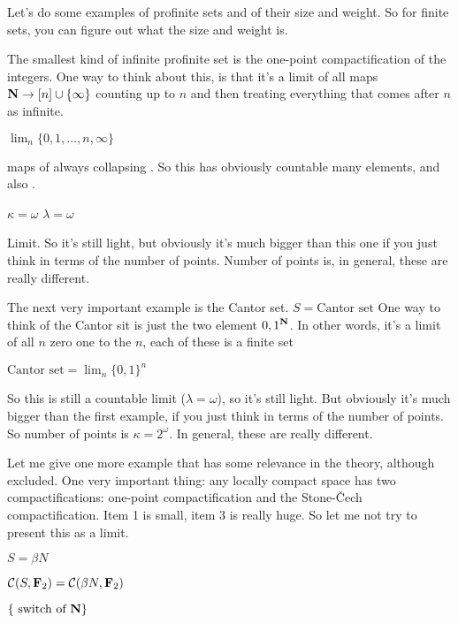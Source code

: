 \begin{example}
Let's do some examples of profinite sets and of their size and weight. 
So for finite sets, you can figure out what the size and weight is.

The smallest kind of infinite profinite set is the one-point compactification of the integers. One way to think about this, is that it's a limit of all maps $\mathbf N \to [n] \cup \{\infty\}$ counting up to $n$ and then treating everything that comes after $n$ as infinite.

$\lim_{n} \{ 0, 1, \dots, n, \infty \} $

maps of always collapsing .
So this has obviously countable many elements, and also .

$\kappa = \omega$ 
$\lambda = \omega$

Limit. So it's still light, but obviously it's much bigger than this one if you just think in terms of the number of points. Number of points is, in general, these are really different.

\item The next very important example is the Cantor set.
$S = \text{Cantor set}$
One way to think of the Cantor sit is just the two element ${0, 1}^{\mathbf N}$. In other words, it's a limit of all $n$ zero one to the $n$, each of these is a finite set

$\text{Cantor set} = \lim_{n} \{ 0,1 \}^n $


So this is still a countable limit ($\lambda = \omega$), so it's still light. But obviously it's much bigger than the first example, if you just think in terms of the number of points. So number of points is $\kappa = 2^\omega$. In general, these are really different.

\item Let me give one more example that has some relevance in the theory, although excluded. One very important thing: any locally compact space has two compactifications: one-point compactification and the Stone-Čech compactification. Item 1 is small, item 3 is really huge. So let me not try to present this as a limit.

$S = \beta N$

$\mathcal{C}(S, \mathbf F_2) = \mathcal{C}(\beta N, \mathbf F_2) $

$ \{ \text{ switch of } \mathbf N \}$



\end{example}
